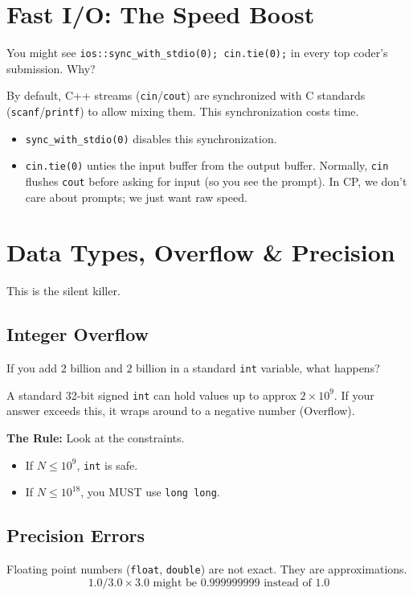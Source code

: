 \documentclass[12pt, a4paper]{report}
\begin{document}
\section{Fast I/O: The Speed Boost}
You might see \texttt{ios::sync\_with\_stdio(0); cin.tie(0);} in every top coder's submission. Why?

By default, C++ streams (\texttt{cin}/\texttt{cout}) are synchronized with C standards (\texttt{scanf}/\texttt{printf}) to allow mixing them. This synchronization costs time.
\begin{itemize}
    \item \texttt{sync\_with\_stdio(0)} disables this synchronization.
    \item \texttt{cin.tie(0)} unties the input buffer from the output buffer. Normally, \texttt{cin} flushes \texttt{cout} before asking for input (so you see the prompt). In CP, we don't care about prompts; we just want raw speed.
\end{itemize}

\section{Data Types, Overflow & Precision}
This is the silent killer. 

\subsection{Integer Overflow}
\begin{thinkbox}
If you add $2$ billion and $2$ billion in a standard \texttt{int} variable, what happens?
\end{thinkbox}

A standard 32-bit signed \texttt{int} can hold values up to approx $2 \times 10^9$. If your answer exceeds this, it wraps around to a negative number (Overflow). 

\textbf{The Rule:} Look at the constraints.
\begin{itemize}
    \item If $N \le 10^9$, \texttt{int} is safe.
    \item If $N \le 10^{18}$, you MUST use \texttt{long long}.
\end{itemize}

\subsection{Precision Errors}
Floating point numbers (\texttt{float}, \texttt{double}) are not exact. They are approximations.
\[ 1.0 / 3.0 \times 3.0 \text{ might be } 0.999999999 \text{ instead of } 1.0 \]
\end{document}
